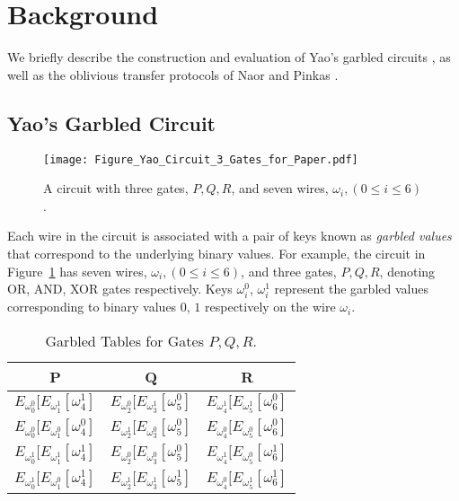\documentclass[10pt,journal,cspaper,compsoc]{IEEEtran}
\begin{document}
 \section{Background}
\label{sec_background}
We briefly describe the construction and evaluation of Yao's garbled circuits \cite{yao82,yao86}, as well as the oblivious transfer protocols of Naor and Pinkas \cite{naor01,naor05}.


\subsection{Yao's Garbled Circuit}

\begin{figure}[ht]
\centering
\texttt{[image: Figure\_Yao\_Circuit\_3\_Gates\_for\_Paper.pdf]}
\vspace{-3 mm}
\caption{A circuit with three gates, $P,Q,R$, and seven wires, $\omega_i, (0\le i\le 6)$.\vspace{-3 mm}}
\label{fig_sample_circuit}
\end{figure}


Each wire in the circuit is associated with a pair of keys known as {\em garbled values} that correspond to the underlying binary values. For example, the circuit in Figure~\ref{fig_sample_circuit} has seven wires, $\omega_i, (0\le i\le 6)$, and three gates, $P,Q,R$, denoting OR, AND, XOR gates respectively. Keys $\omega_i^0$, $\omega_i^1$ represent the garbled values corresponding to binary values $0$, $1$ respectively on the wire $\omega_i$.


\begin{table}[!t]
\renewcommand{\arraystretch}{1.3}
\caption{Garbled Tables for Gates $P,Q,R$.}
\label{table_garbled_tables}
\centering
\begin{tabular}{||c||c||c||}
\hline
\bfseries P & \bfseries Q & \bfseries R\\
\hline
$E_{\omega_0^0}[E_{\omega_1^1}[\omega_4^1]$ & $E_{\omega_2^0}[E_{\omega_3^1}[\omega_5^0]$ & $E_{\omega_4^1}[E_{\omega_5^1}[\omega_6^0]$\\
$E_{\omega_0^0}[E_{\omega_1^0}[\omega_4^0]$ & $E_{\omega_2^1}[E_{\omega_3^0}[\omega_5^0]$ & $E_{\omega_4^0}[E_{\omega_5^0}[\omega_6^0]$\\
$E_{\omega_0^1}[E_{\omega_1^1}[\omega_4^1]$ & $E_{\omega_2^0}[E_{\omega_3^0}[\omega_5^0]$ & $E_{\omega_4^1}[E_{\omega_5^0}[\omega_6^1]$\\
$E_{\omega_0^1}[E_{\omega_1^0}[\omega_4^1]$ & $E_{\omega_2^1}[E_{\omega_3^1}[\omega_5^1]$ & $E_{\omega_4^0}[E_{\omega_5^1}[\omega_6^1]$\\
\hline
\end{tabular}
\vspace{-3 mm}
\end{table}
\end{document}
